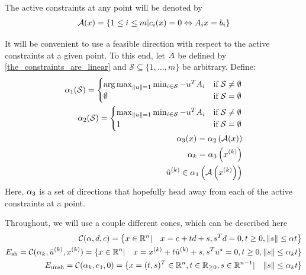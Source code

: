 The active constraints at any point will be denoted by
\begin{align}
{\mathcal A}(x) = \{1 \le i \le m | c_i(x) = 0 \Leftrightarrow {{A}}_ix = {{b}}_i \} \label{define_activei}
\end{align}

It will be convenient to use a feasible direction with respect to the active constraints at a given point.
To this end, let ${A}$ be defined by \cref{the_constraints_are_linear} and $\mathcal S \subseteq \{1, \ldots, m\}$ be arbitrary.
Define:
\begin{align}
{\alpha_1} (\mathcal S) = \begin{cases}
\operatorname*{arg\,max}_{\|u\| = 1} \min_{i \in \mathcal S} -u^T{{A}}_i & \text{if} \; \mathcal S \ne \emptyset \\
\emptyset & \text{if} \; \mathcal S = \emptyset
\end{cases} \label{define_alpha_one} \\
{\alpha_2}(\mathcal S) = \begin{cases}
\max_{\|u\| = 1} \min_{i \in \mathcal S} -u^T{{A}}_i & \text{if} \; \mathcal S \ne \emptyset \\
1 & \text{if} \; \mathcal S = \emptyset
\end{cases} \label{define_alpha_two}\\
{\alpha_3}(x) = {\alpha_2}\left({\mathcal A}(x)\right) \label{define_alpha_three} \\
\alpha_k =  {\alpha_3}\left(x^{(k)}\right) \label{define_alpha_k} \\
{{{\hat u}^{(k)}}} \in  {\alpha_1}\left({\mathcal A}\left(x^{(k)}\right)\right) \label{define_u_k}
\end{align}
Here, ${\alpha_3}$ is a set of directions that hopefully head away from each of the active constraints at a point.

Throughout, we will use a couple different cones, which can be described here
\begin{align}
\mathcal C(\alpha, d, c) = \left\{x \in \mathbb R^n | \quad x = c + t d + s, s^Td= 0, t \ge 0, \|s\| \le \alpha t\right\} \\
{E_{\textrm{sh}}} = \mathcal C(\alpha_k, {{{\hat u}^{(k)}}}, x^{(k)}) = \{x \in \mathbb R^n | \quad x = x^{(k)} + t {{{\hat u}^{(k)}}}+ s, s^Tu^{\star} = 0, t \ge 0, \|s\| \le \alpha_k t\} \label{defineunshiftedcone} \\
{E_{\textrm{unsh}}} = \mathcal C(\alpha_k, e_1, 0) =  \{x = (t, s)^T \in \mathbb R^n, t \in \mathbb R_{\ge 0}, s \in \mathbb R^{n-1} |\quad \|s\| \le \alpha_k t \} \label{defineshiftedcone}
\end{align}

